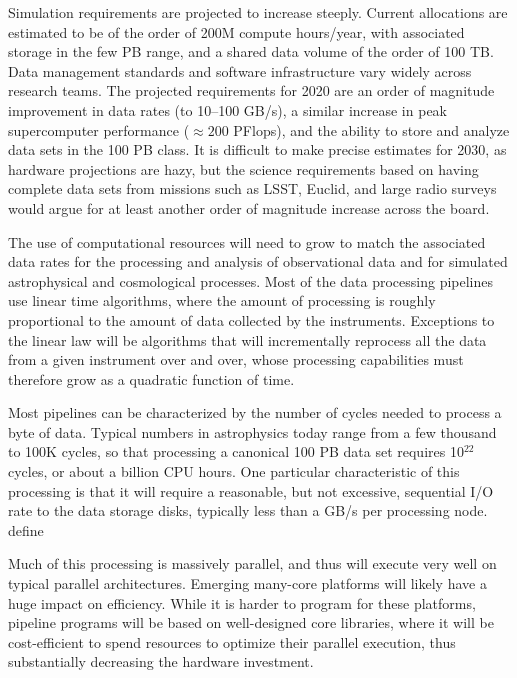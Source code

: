 Simulation requirements are projected to increase steeply. Current
allocations are estimated to be of the order of 200M compute
hours/year, with associated storage in the few PB range, and a shared
data volume of the order of 100 TB. Data management standards and
software infrastructure vary widely across research teams. The
projected requirements for 2020 are an order of magnitude improvement
in data rates (to 10--100 GB/s), a similar increase in peak
supercomputer performance ($\approx 200$ PFlops), and the ability to store and
analyze data sets in the 100 PB class. It is difficult to make precise
estimates for 2030, as hardware projections are hazy, but the
science requirements based on having complete data sets from missions
such as LSST, Euclid, and large radio surveys would argue for at least
another order of magnitude increase across the board.


The use of computational resources will need to grow to match the
associated data rates for the processing and analysis of observational
data and for simulated astrophysical and cosmological processes. Most
of the data processing pipelines use linear time
algorithms, where the amount of processing is roughly proportional to
the amount of data collected by the instruments. Exceptions to the
linear law will be algorithms that will incrementally reprocess all
the data from a given instrument over and over, whose processing
capabilities must therefore grow as a quadratic function of time.

Most pipelines can be characterized by the number of cycles needed to
process a byte of data. Typical numbers in astrophysics today range
from a few thousand to 100K cycles, so that processing a canonical 100 PB
data set requires 10$^{22}$ cycles, or about a billion CPU hours.
One particular characteristic of this processing is that it
will require a reasonable, but not excessive, sequential I/O rate to
the data storage disks, typically less than a GB/s per
processing node. {\red define}

Much of this processing is massively parallel, and thus will execute
very well on typical parallel architectures. Emerging many-core platforms will
likely have a huge impact on efficiency.
While it is harder to program for these platforms, pipeline
programs will be based on well-designed core libraries, where it will
be cost-efficient to spend resources to optimize their parallel
execution, thus substantially decreasing the hardware investment.


